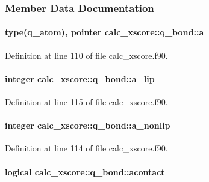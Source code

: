 \subsubsection{Member Data Documentation}
\hypertarget{structcalc__xscore_1_1q__bond_a4e8218074e86f8dbf63c27eaf736ddc3}{
\paragraph[{a}]{\setlength{\rightskip}{0pt plus 5cm}type({\bf q\-\_\-atom}), pointer calc\-\_\-xscore\-::q\-\_\-bond\-::a}}\label{structcalc__xscore_1_1q__bond_a4e8218074e86f8dbf63c27eaf736ddc3}


Definition at line 110 of file calc\-\_\-xscore.\-f90.

\hypertarget{structcalc__xscore_1_1q__bond_a4c412fd95b58c2c8afd3092e8363229d}{
\paragraph[{a\-\_\-lip}]{\setlength{\rightskip}{0pt plus 5cm}integer calc\-\_\-xscore\-::q\-\_\-bond\-::a\-\_\-lip}}\label{structcalc__xscore_1_1q__bond_a4c412fd95b58c2c8afd3092e8363229d}


Definition at line 115 of file calc\-\_\-xscore.\-f90.

\hypertarget{structcalc__xscore_1_1q__bond_a19cca446eb7c826897ec3d274920b4ac}{
\paragraph[{a\-\_\-nonlip}]{\setlength{\rightskip}{0pt plus 5cm}integer calc\-\_\-xscore\-::q\-\_\-bond\-::a\-\_\-nonlip}}\label{structcalc__xscore_1_1q__bond_a19cca446eb7c826897ec3d274920b4ac}


Definition at line 114 of file calc\-\_\-xscore.\-f90.

\hypertarget{structcalc__xscore_1_1q__bond_aadb2d14ad0bc14fb2d9a288cdab7bd58}{
\paragraph[{acontact}]{\setlength{\rightskip}{0pt plus 5cm}logical calc\-\_\-xscore\-::q\-\_\-bond\-::acontact}}\label{structcalc__xscore_1_1q__bond_aadb2d14ad0bc14fb2d9a288cdab7bd58}


